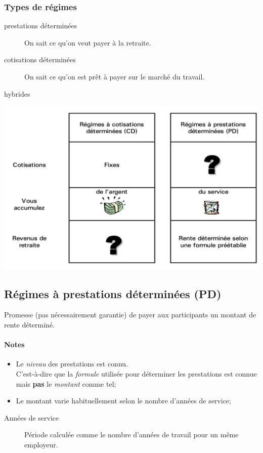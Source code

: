 \documentclass[10pt, french]{article}
\begin{document}
\begin{multicols*}{3}
\subsubsection*{Types de régimes}

\begin{description}
	\item[prestations déterminées]	On sait ce qu'on veut payer à la retraite.
	\item[cotisations déterminées]	On sait ce qu'on est prêt à payer sur le marché du travail.
	\item[hybrides]
\end{description}

\begin{center}
	\includegraphics[scale=0.33]{src/ACT-1005/CD-PD-table.png}
\end{center}

\columnbreak

\subsection{Régimes à prestations déterminées (PD)}

\begin{definitionNOHFILL}[Description]
Promesse (pas nécessairement garantie) de payer aux participants un montant de rente déterminé.

\paragraph{Notes}
\begin{itemize}[leftmargin = *]
	\item	Le \textit{niveau} des prestations est connu.\\
			C'est-à-dire que la \textit{formule} utilisée pour déterminer les prestations est connue mais \textbf{pas} le \textit{montant} comme tel;
	\item	Le montant varie habituellement selon le nombre d'années de service;
\end{itemize}
\begin{description}
	\item[Années de service]	Période calculée comme le nombre d'années de travail pour un même employeur.
\end{description}
\end{definitionNOHFILL}


\end{multicols*}
\end{document}
